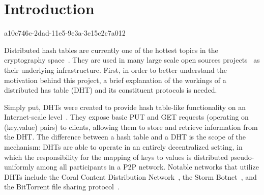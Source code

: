 \documentclass[12pt]{article}
\begin{document}
\section{Introduction}
a10c746c-2dad-11e5-9e3a-3c15c2c7a012\par Distributed hash tables are currently one of the hottest topics in the cryptography space~\cite{Stoica:2001dj,Rowstron:2001ea,Ratnasamy:2001wn}. They are used in many large scale open sources projects~\cite{Freitas:2013tb,Xu:2010vs,Perfitt:2010fh} as their underlying infrastructure. First, in order to better understand the motivation behind this project, a brief explanation of the workings of a distributed has table (DHT) and its constituent protocols is needed.

\par Simply put, DHTs were created to provide hash table-like functionality on an Internet-scale level~\cite{Ratnasamy:2001wn}. They expose basic PUT and GET requests (operating on (key,value) pairs) to clients, allowing them to store and retrieve information from the DHT. The difference between a hash table and a DHT is the scope of the mechanism: DHTs are able to operate in an entirely decentralized setting, in which the responsibility for the mapping of keys to values is distributed pseudo-uniformly among all participants in a P2P network. Notable networks that utilize DHTs include the Coral Content Distribution Network~\cite{Freedman:2004vb}, the Storm Botnet~\cite{Holz:2008uk}, and the BitTorrent file sharing protocol~\cite{Cohen:y1_8mBnw}.
\end{document}

